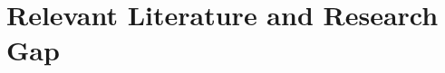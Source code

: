 \documentclass{beamer}
\begin{document}

\section{Relevant Literature and Research Gap}
\end{document}
